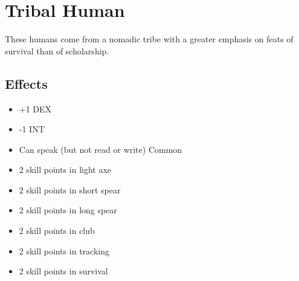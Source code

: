 \section{Tribal Human}\label{culture:tribal-human}
These humans come from a nomadic tribe with a greater emphasis on feats of
survival than of scholarship.

\subsection{Effects}
\begin{itemize}
    \item +1 DEX
    \item -1 INT
    \item Can speak (but not read or write) Common
    \item 2 skill points in light axe
    \item 2 skill points in short spear
    \item 2 skill points in long spear
    \item 2 skill points in club
    \item 2 skill points in tracking
    \item 2 skill points in survival
\end{itemize}

